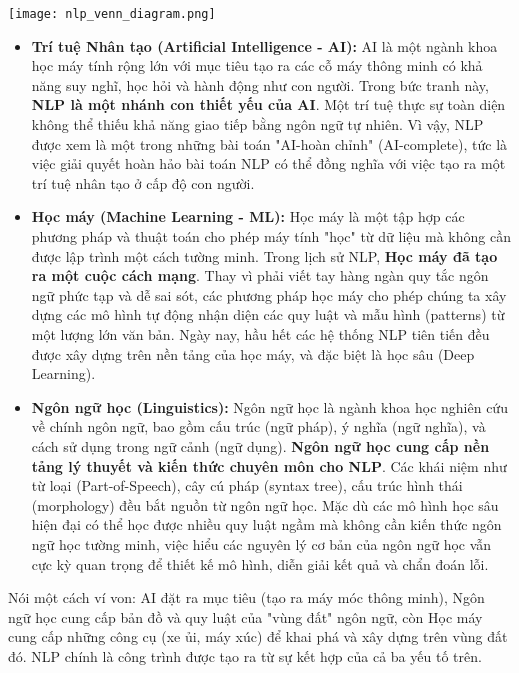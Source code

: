\begin{center}
    \texttt{[image: nlp\_venn\_diagram.png]} 
    \label{fig:venn_diagram}
\end{center}

\begin{itemize}
    \item \textbf{Trí tuệ Nhân tạo (Artificial Intelligence - AI):} AI là một ngành khoa học máy tính rộng lớn với mục tiêu tạo ra các cỗ máy thông minh có khả năng suy nghĩ, học hỏi và hành động như con người. Trong bức tranh này, \textbf{NLP là một nhánh con thiết yếu của AI}. Một trí tuệ thực sự toàn diện không thể thiếu khả năng giao tiếp bằng ngôn ngữ tự nhiên. Vì vậy, NLP được xem là một trong những bài toán "AI-hoàn chỉnh" (AI-complete), tức là việc giải quyết hoàn hảo bài toán NLP có thể đồng nghĩa với việc tạo ra một trí tuệ nhân tạo ở cấp độ con người.
    
    \item \textbf{Học máy (Machine Learning - ML):} Học máy là một tập hợp các phương pháp và thuật toán cho phép máy tính "học" từ dữ liệu mà không cần được lập trình một cách tường minh. Trong lịch sử NLP, \textbf{Học máy đã tạo ra một cuộc cách mạng}. Thay vì phải viết tay hàng ngàn quy tắc ngôn ngữ phức tạp và dễ sai sót, các phương pháp học máy cho phép chúng ta xây dựng các mô hình tự động nhận diện các quy luật và mẫu hình (patterns) từ một lượng lớn văn bản. Ngày nay, hầu hết các hệ thống NLP tiên tiến đều được xây dựng trên nền tảng của học máy, và đặc biệt là học sâu (Deep Learning).
    
    \item \textbf{Ngôn ngữ học (Linguistics):} Ngôn ngữ học là ngành khoa học nghiên cứu về chính ngôn ngữ, bao gồm cấu trúc (ngữ pháp), ý nghĩa (ngữ nghĩa), và cách sử dụng trong ngữ cảnh (ngữ dụng). \textbf{Ngôn ngữ học cung cấp nền tảng lý thuyết và kiến thức chuyên môn cho NLP}. Các khái niệm như từ loại (Part-of-Speech), cây cú pháp (syntax tree), cấu trúc hình thái (morphology) đều bắt nguồn từ ngôn ngữ học. Mặc dù các mô hình học sâu hiện đại có thể học được nhiều quy luật ngầm mà không cần kiến thức ngôn ngữ học tường minh, việc hiểu các nguyên lý cơ bản của ngôn ngữ học vẫn cực kỳ quan trọng để thiết kế mô hình, diễn giải kết quả và chẩn đoán lỗi.
\end{itemize}

Nói một cách ví von: AI đặt ra mục tiêu (tạo ra máy móc thông minh), Ngôn ngữ học cung cấp bản đồ và quy luật của "vùng đất" ngôn ngữ, còn Học máy cung cấp những công cụ (xe ủi, máy xúc) để khai phá và xây dựng trên vùng đất đó. NLP chính là công trình được tạo ra từ sự kết hợp của cả ba yếu tố trên.

